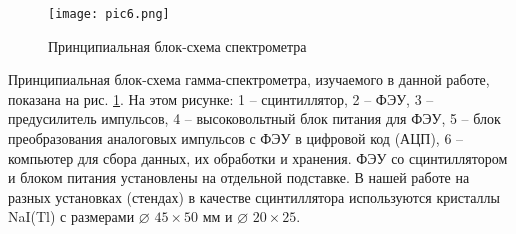 \begin{figure}[h!]
  \centering
  \texttt{[image: pic6.png]}
  \caption{Принципиальная блок-схема спектрометра}
  \label{pic:spectrometer}
\end{figure}

Принципиальная блок-схема гамма-спектрометра, изучаемого в данной работе,
показана на рис. \ref{pic:spectrometer}. На этом рисунке: 1 -- сцинтиллятор, 2
-- ФЭУ, 3 -- предусилитель импульсов, 4 -- высоковольтный блок питания для ФЭУ,
5 -- блок преобразования аналоговых импульсов с ФЭУ в цифровой код (АЦП), 6 --
компьютер для сбора данных, их обработки и хранения. ФЭУ со сцинтиллятором и
блоком питания установлены на отдельной подставке. В нашей работе на разных
установках (стендах) в качестве сцинтиллятора используются кристаллы NaI(Tl) с
размерами $\diameter $ $45 \times 50$ мм и $\diameter$ $20 \times 25$.